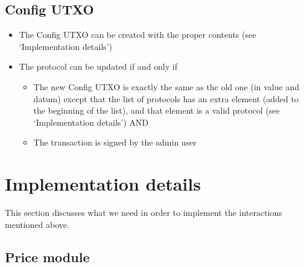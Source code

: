\documentclass{article} %
\begin{document}
\subsection{Config UTXO}

\begin{itemize}
  \item The Config UTXO can be created with the proper contents (see
    `Implementation details')
  \item The protocol can be updated if and only if
    \begin{itemize}
      \item The new Config UTXO is exactly the same as the old one (in value and
        datum) except that the list of protocols has an extra element (added to
        the beginning of the list), and that element is a valid protocol (see
        `Implementation details') AND
      \item The transaction is signed by the admin user
    \end{itemize}
\end{itemize}

\section{Implementation details}

This section discusses what we need in order to implement the interactions
mentioned above.

\subsection{Price module}
\end{document}
